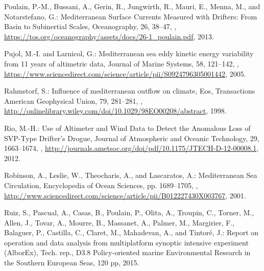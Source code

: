 \documentclass[essd]{copernicus}
\begin{document}
\begin{thebibliography}{46}
Poulain, P.-M., Bussani, A., Gerin, R., Jungwirth, R., Mauri, E., Menna, M.,
  and Notarstefano, G.: Mediterranean Surface Currents Measured with Drifters:
  From Basin to Subinertial Scales, Oceanography, 26, 38--47,
  ,
  \urlprefix\url{https://tos.org/oceanography/assets/docs/26-1_poulain.pdf},
  2013.

Pujol, M.-I. and Larnicol, G.: {Mediterranean sea eddy kinetic energy
  variability from 11 years of altimetric data}, Journal of Marine Systems, 58,
  121–142, ,
  \urlprefix\url{https://www.sciencedirect.com/science/article/pii/S0924796305001442},
  2005.

Rahmstorf, S.: {Influence of mediterranean outflow on climate}, Eos,
  Transactions American Geophysical Union, 79, 281--281,
  ,
  \urlprefix\url{http://onlinelibrary.wiley.com/doi/10.1029/98EO00208/abstract},
  1998.

Rio, M.-H.: Use of Altimeter and Wind Data to Detect the Anomalous Loss of
  {SVP}-Type Drifter's Drogue, Journal of Atmospheric and Oceanic Technology,
  29, 1663--1674, ,
  \urlprefix\url{http://journals.ametsoc.org/doi/pdf/10.1175/JTECH-D-12-00008.1},
  2012.

Robinson, A., Leslie, W., Theocharis, A., and Lascaratos, A.: Mediterranean Sea
  Circulation, {Encyclopedia of Ocean Sciences}, pp. 1689--1705,
  ,
  \urlprefix\url{http://www.sciencedirect.com/science/article/pii/B012227430X003767},
  2001.

Ruiz, S., Pascual, A., Casas, B., Poulain, P., Olita, A., Troupin, C., Torner,
  M., Allen, J., Tovar, A., Mourre, B., Massanet, A., Palmer, M., Margirier,
  F., Balaguer, P., Castilla, C., Claret, M., Mahadevan, A., and Tintor\'{e},
  J.: {Report on operation and data analysis from multiplatform synoptic
  intensive experiment (AlborEx)}, Tech. rep., D3.8 Policy-oriented marine
  Environmental Research in the Southern European Seas, {120 pp}, 2015.


\end{thebibliography}
\end{document}
